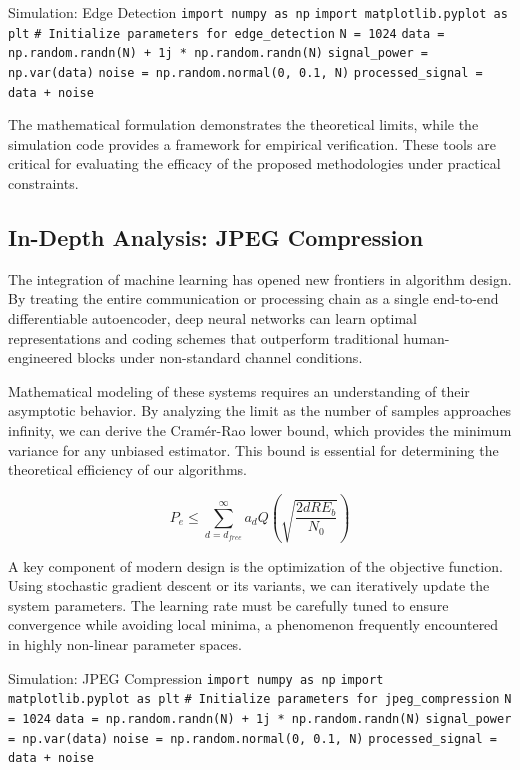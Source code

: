 \begin{pythonbox}{Simulation: Edge Detection}
\texttt{import numpy as np}
\texttt{import matplotlib.pyplot as plt}
\texttt{}
\texttt{\# Initialize parameters for edge\_detection}
\texttt{N = 1024}
\texttt{data = np.random.randn(N) + 1j * np.random.randn(N)}
\texttt{signal\_power = np.var(data)}
\texttt{noise = np.random.normal(0, 0.1, N)}
\texttt{processed\_signal = data + noise}
\end{pythonbox}

\vspace{0.5cm}
The mathematical formulation demonstrates the theoretical limits, while the simulation code provides a framework for empirical verification. These tools are critical for evaluating the efficacy of the proposed methodologies under practical constraints.


\subsection{In-Depth Analysis: JPEG Compression}
The integration of machine learning has opened new frontiers in algorithm design. By treating the entire communication or processing chain as a single end-to-end differentiable autoencoder, deep neural networks can learn optimal representations and coding schemes that outperform traditional human-engineered blocks under non-standard channel conditions.

Mathematical modeling of these systems requires an understanding of their asymptotic behavior. By analyzing the limit as the number of samples approaches infinity, we can derive the Cramér-Rao lower bound, which provides the minimum variance for any unbiased estimator. This bound is essential for determining the theoretical efficiency of our algorithms.

\begin{equation}
    P_e \leq \sum_{d=d_{free}}^{\infty} a_d Q\left(\sqrt{\frac{2 d R E_b}{N_0}}\right)
\end{equation}

A key component of modern design is the optimization of the objective function. Using stochastic gradient descent or its variants, we can iteratively update the system parameters. The learning rate must be carefully tuned to ensure convergence while avoiding local minima, a phenomenon frequently encountered in highly non-linear parameter spaces.

\begin{pythonbox}{Simulation: JPEG Compression}
\texttt{import numpy as np}
\texttt{import matplotlib.pyplot as plt}
\texttt{}
\texttt{\# Initialize parameters for jpeg\_compression}
\texttt{N = 1024}
\texttt{data = np.random.randn(N) + 1j * np.random.randn(N)}
\texttt{signal\_power = np.var(data)}
\texttt{noise = np.random.normal(0, 0.1, N)}
\texttt{processed\_signal = data + noise}
\end{pythonbox}

